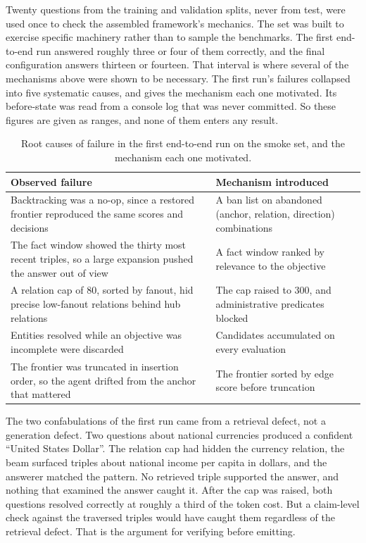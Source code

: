 Twenty questions from the training and validation splits, never from test, were
used once to check the assembled framework's mechanics. The set was built to
exercise specific machinery rather than to sample the benchmarks. The first
end-to-end run answered roughly three or four of them correctly, and the final
configuration answers thirteen or fourteen. That interval is where several of
the mechanisms above were shown to be necessary. The first run's failures
collapsed into five systematic causes, and  gives the
mechanism each one motivated. Its before-state was read from a console log that
was never committed. So these figures are given as ranges, and none of them
enters any result.

\begin{table}[!t]
\caption{Root causes of failure in the first end-to-end run on the smoke set,
  and the mechanism each one motivated.}
\label{tab:rootcauses}
\centering
\small
\begin{tabular}{@{}L{42mm}L{39mm}@{}}
\toprule
Observed failure & Mechanism introduced \\
\midrule
Backtracking was a no-op, since a restored frontier reproduced the same scores and decisions & A ban list on abandoned (anchor, relation, direction) combinations \\
\addlinespace
The fact window showed the thirty most recent triples, so a large expansion pushed the answer out of view & A fact window ranked by relevance to the objective \\
\addlinespace
A relation cap of $80$, sorted by fanout, hid precise low-fanout relations behind hub relations & The cap raised to $300$, and administrative predicates blocked \\
\addlinespace
Entities resolved while an objective was incomplete were discarded & Candidates accumulated on every evaluation \\
\addlinespace
The frontier was truncated in insertion order, so the agent drifted from the anchor that mattered & The frontier sorted by edge score before truncation \\
\bottomrule
\end{tabular}
\end{table}

The two confabulations of the first run came from a retrieval defect, not a
generation defect. Two questions about national currencies produced a confident
``United States Dollar''. The relation cap had hidden the currency relation, the
beam surfaced triples about national income per capita in dollars, and the
answerer matched the pattern. No retrieved triple supported the answer, and
nothing that examined the answer caught it. After the cap was raised, both
questions resolved correctly at roughly a third of the token cost. But a
claim-level check against the traversed triples would have caught them
regardless of the retrieval defect. That is the argument for verifying before
emitting.

